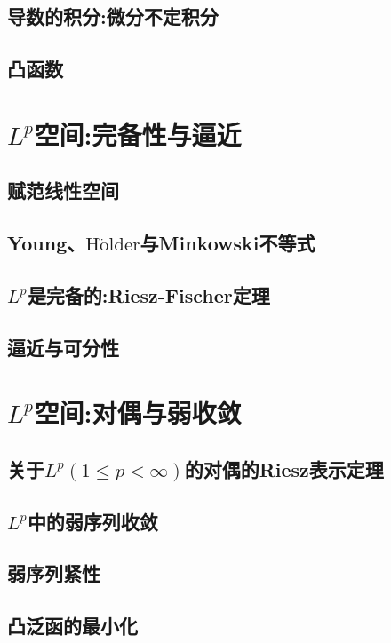 \documentclass[lang=cn,newtx,10pt,scheme=chinese]{../Template/elegantbook}
\begin{document}
\section{导数的积分:微分不定积分}

\section{凸函数}






\chapter{$L^p$空间:完备性与逼近}

\section{赋范线性空间}

\section{Young、$\mathrm{H}\ddot{\mathrm{o}}\mathrm{lder}$与Minkowski不等式}

\section{$L^p$是完备的:Riesz-Fischer定理}

\section{逼近与可分性}





\chapter{$L^p$空间:对偶与弱收敛}

\section{关于$L^p(1\leqslant p<\infty)$的对偶的Riesz表示定理}

\section{$L^p$中的弱序列收敛}

\section{弱序列紧性}

\section{凸泛函的最小化}
\end{document}
